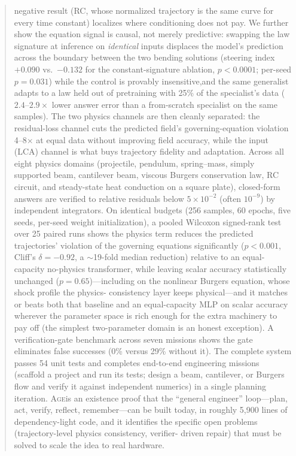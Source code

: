 \documentclass[11pt,a4paper]{article}
\newcommand{\Age}{\textsc{Age}}
\begin{document}
\begin{abstract}
negative result (RC, whose normalized trajectory is the same curve for
every time constant) localizes where conditioning does not pay. We further
show the equation signal is causal, not merely predictive: swapping the
law signature at inference on \emph{identical} inputs displaces the model's
prediction across the boundary between the two bending solutions
(steering index $+0.090$ vs.\ $-0.132$ for the constant-signature
ablation, $p<0.0001$; per-seed $p=0.031$) while the control is provably
insensitive,and the same generalist adapts to a law held out of pretraining with 25\%
of the specialist's data ($2.4$--$2.9\times$ lower answer error than a
from-scratch specialist on the same samples). The two physics channels are
then cleanly separated: the residual-loss channel cuts the predicted
field's governing-equation violation 4--8$\times$ at equal data without
improving field accuracy, while the input (LCA) channel is what buys
trajectory fidelity and adaptation. Across all
eight physics domains (projectile, pendulum, spring--mass, simply
supported beam, cantilever beam, viscous Burgers conservation law, RC
circuit, and steady-state heat conduction on a square plate), closed-form
answers are verified to relative residuals below $5\times10^{-2}$ (often
$10^{-9}$) by independent integrators. On identical budgets (256 samples, 60
epochs, five seeds, per-seed weight initialization), a pooled Wilcoxon
signed-rank test over 25 paired runs shows the physics term reduces the
predicted trajectories' violation of the governing equations
significantly ($p<0.001$, Cliff's $\delta=-0.92$, a $\sim$19-fold median
reduction) relative to an equal-capacity no-physics transformer, while
leaving scalar accuracy statistically unchanged ($p=0.65$)---including on
the nonlinear Burgers equation, whose shock profile the physics-
consistency layer keeps physical---and it matches or beats both that
baseline and an equal-capacity MLP on scalar accuracy wherever the
parameter space is rich enough for the extra machinery to pay off (the
simplest two-parameter domain is an honest exception). A verification-gate
benchmark across seven missions shows the gate eliminates false successes
(0\% versus 29\% without it). The complete system
passes 54 unit tests and completes end-to-end engineering missions
(scaffold a project and run its tests; design a beam, cantilever, or
Burgers flow and verify it against independent numerics) in a single
planning iteration. \Age is an existence proof that the ``general
engineer'' loop---plan, act, verify, reflect, remember---can be built today,
in roughly 5,900 lines of dependency-light code, and it identifies the
specific open problems (trajectory-level physics consistency, verifier-
driven repair) that must be solved to scale the idea to real hardware.
\end{abstract}
\end{document}
